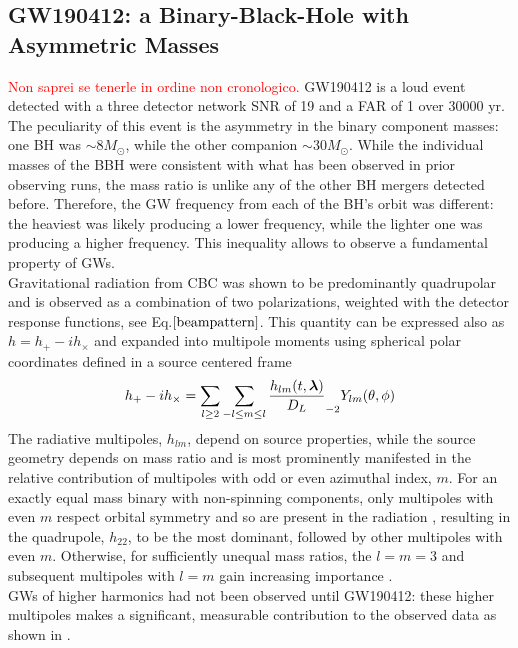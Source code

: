 \documentclass[binding=0.6cm, LaM]{sapthesis}
\newcommand{\fpg}[1]{\textcolor{red}{#1} }
\begin{document}
\subsection{GW190412: a Binary-Black-Hole with Asymmetric Masses}
\fpg{Non saprei se tenerle in ordine non cronologico.}
	GW190412 is a loud event detected with a three detector network SNR of 19 and a FAR of 1 over 30000 yr.
	The peculiarity of this event is the asymmetry in the binary component masses:
	one BH was $\sim8 M_\odot$, while the other companion $\sim30 M_\odot$.
	While the individual masses of the BBH were consistent with what has been observed in
	prior observing runs, the mass ratio is unlike any of the other BH mergers detected before. 
	Therefore, the GW frequency from each of the BH’s orbit was different: 
	the heaviest was likely producing a lower frequency, while the lighter one was producing a higher frequency.
	This inequality allows to observe a fundamental property of GWs. \\
	Gravitational radiation from CBC was shown to be predominantly quadrupolar \cite{177-179} 
	and is observed as a combination of two polarizations, weighted with the detector response functions, see Eq.$\ref{beampattern}$. 
	This quantity can be expressed also as $h = h_{+}-ih_{\times}$ and expanded into multipole moments 
	using spherical polar coordinates defined in a source centered frame \cite{225}
		\begin{equation}
			h_{+}-ih_{\times} = \sum_{l \geq 2} \sum_{-l \leq m \leq l} {{h_{lm}(t, \boldsymbol{\lambda})} \over {D_L}} _{-2} Y_{lm}(\theta, \phi)
		\end{equation}
	The radiative multipoles, $h_{lm}$, depend on source properties, while the source geometry 
	depends on mass ratio and is most prominently manifested in the relative contribution 
	of multipoles with odd or even azimuthal index, $m$.
	For an exactly equal mass binary with non-spinning components, only multipoles with even $m$ 
	respect orbital symmetry and so are present in the radiation \cite{187}, resulting in the quadrupole, $h_{22}$, 
	to be the most dominant, followed by other multipoles with even $m$. 
	Otherwise, for sufficiently unequal mass ratios, the $l = m = 3$ and subsequent 
	multipoles with $l = m$ gain increasing importance \cite{187-192}. \\
	GWs of higher harmonics had not been observed until GW190412:
	these higher multipoles makes a significant, measurable contribution to the observed data as shown in \cite{133}. \\
\end{document}
